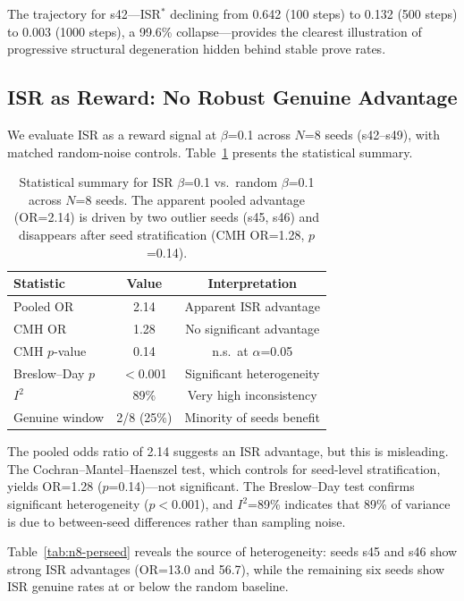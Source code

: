 \documentclass[11pt,a4paper]{article}
\newcommand{\isr}{\textsc{ISR}}
\begin{document}
The trajectory for s42---\isr{}$^*$ declining from 0.642 (100 steps) to 0.132 (500 steps) to 0.003 (1000 steps), a 99.6\% collapse---provides the clearest illustration of progressive structural degeneration hidden behind stable prove rates.

\subsection{ISR as Reward: No Robust Genuine Advantage}
\label{sec:isr-reward}

We evaluate \isr{} as a reward signal at $\beta$=0.1 across $N$=8 seeds (s42--s49), with matched random-noise controls.
Table~\ref{tab:n8-stats} presents the statistical summary.

\begin{table}[t]
\centering
\small
\begin{tabular}{lcc}
\toprule
Statistic & Value & Interpretation \\
\midrule
Pooled OR & 2.14 & Apparent \isr{} advantage \\
CMH OR & 1.28 & No significant advantage \\
CMH $p$-value & 0.14 & n.s.\ at $\alpha$=0.05 \\
Breslow--Day $p$ & $<$0.001 & Significant heterogeneity \\
$I^2$ & 89\% & Very high inconsistency \\
Genuine window & 2/8 (25\%) & Minority of seeds benefit \\
\bottomrule
\end{tabular}
\caption{Statistical summary for \isr{} $\beta$=0.1 vs.\ random $\beta$=0.1 across $N$=8 seeds. The apparent pooled advantage (OR=2.14) is driven by two outlier seeds (s45, s46) and disappears after seed stratification (CMH OR=1.28, $p$=0.14).}
\label{tab:n8-stats}
\end{table}

The pooled odds ratio of 2.14 suggests an \isr{} advantage, but this is misleading.
The Cochran--Mantel--Haenszel test, which controls for seed-level stratification, yields OR=1.28 ($p$=0.14)---not significant.
The Breslow--Day test confirms significant heterogeneity ($p<$0.001), and $I^2$=89\% indicates that 89\% of variance is due to between-seed differences rather than sampling noise.

Table~\ref{tab:n8-perseed} reveals the source of heterogeneity: seeds s45 and s46 show strong \isr{} advantages (OR=13.0 and 56.7), while the remaining six seeds show \isr{} genuine rates at or below the random baseline.
\end{document}
